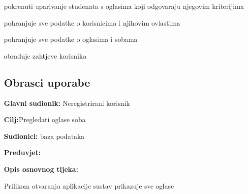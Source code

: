\begin{packed_enum}
	\item  {}
	
	\begin{packed_enum}
		\item pokrenuti uparivanje studenata s oglasima koji odgovaraju njegovim kriterijima
		
	\end{packed_enum}
	
	\item  {}
	
	\begin{packed_enum}
		\item pohranjuje sve podatke o korisnicima i njihovim ovlastima
		\item pohranjuje sve podatke o oglasima i sobama
	\end{packed_enum}
	
	
	\item  {}
	
	\begin{packed_enum}
		\item obrađuje zahtjeve korisnika
		
	\end{packed_enum}
	
	
\end{packed_enum}

\eject 



\subsection{Obrasci uporabe}




\noindent {}
\begin{packed_item}
	
	\item \textbf{Glavni sudionik: }Neregistrirani korisnik
	\item  \textbf{Cilj:}Pregledati oglase soba
	\item  \textbf{Sudionici:} baza podataka
	\item  \textbf{Preduvjet:} 
	\item  \textbf{Opis osnovnog tijeka:}
	
	\item[] \begin{packed_enum}
		
		\item Prilikom otvaranja aplikacije sustav prikazuje sve oglase
		
	\end{packed_enum}
	
	
	
	
\end{packed_item}

